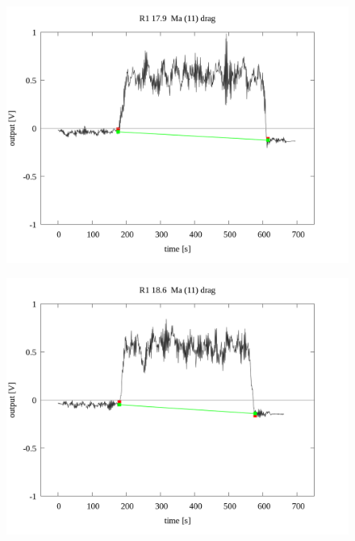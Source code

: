 \documentclass[a4paper]{jsarticle}
\begin{document}
\begin{figure}[htbp]
    \footnotesize
    \begin{center}
        \includegraphics[width=140mm]{../../../../33_result/210806/moving_average/11/drag/03/R1_17.9_ma(11)_drag_03.png}
    \end{center}
\end{figure}

\begin{figure}[htbp]
    \footnotesize
    \begin{center}
        \includegraphics[width=140mm]{../../../../33_result/210806/moving_average/11/drag/03/R1_18.6_ma(11)_drag_03.png}
    \end{center}
\end{figure}
\end{document}
